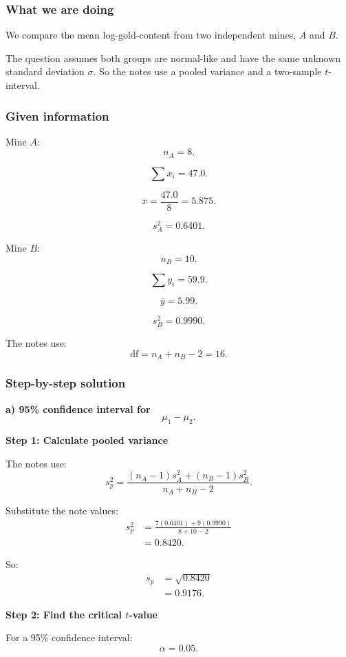 \documentclass[10pt]{article}
\begin{document}
\subsubsection*{What we are doing}

We compare the mean log-gold-content from two
independent mines, \(A\) and \(B\).

The question assumes both groups are normal-like and
have the same unknown standard deviation \(\sigma\).
So the notes use a pooled variance and a two-sample
\(t\)-interval.

\subsubsection*{Given information}

Mine \(A\):
\[
n_A=8.
\]

\[
\sum x_i=47.0.
\]

\[
\bar{x}
=
\frac{47.0}{8}
=5.875.
\]

\[
s_A^2=0.6401.
\]

Mine \(B\):
\[
n_B=10.
\]

\[
\sum y_i=59.9.
\]

\[
\bar{y}
=5.99.
\]

\[
s_B^2=0.9990.
\]

The notes use:
\[
\text{df}=n_A+n_B-2=16.
\]

\subsubsection*{Step-by-step solution}

\textbf{a) 95\% confidence interval for}
\[
\mu_1-\mu_2.
\]

\textbf{Step 1: Calculate pooled variance}

The notes use:
\[
s_p^2
=
\frac{
(n_A-1)s_A^2+(n_B-1)s_B^2
}{
n_A+n_B-2
}.
\]

Substitute the note values:
\begin{align*}
s_p^2
&=
\frac{
7(0.6401)+9(0.9990)
}{
8+10-2
}
\\[2mm]
&=
0.8420.
\end{align*}

So:
\begin{align*}
s_p
&=
\sqrt{0.8420}
\\[2mm]
&=
0.9176.
\end{align*}

\textbf{Step 2: Find the critical \(t\)-value}

For a 95\% confidence interval:
\[
\alpha=0.05.
\]
\end{document}
